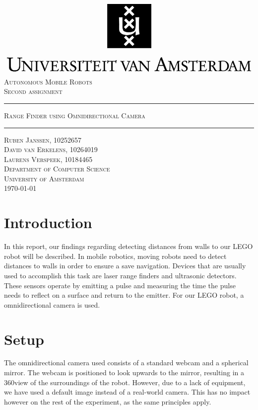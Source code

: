 \documentclass[12pt]{article}
\begin{document}
\begin{titlepage}
\begin{center}
    \includegraphics[width=\textwidth]{./logo.png}
    \\ [2.5cm]
    \textsc{\Large Autonomous Mobile Robots}
    \\ [0.5cm]
    \textsc{\large Second assignment}
    \\ [1cm]
    \hrule
    \vspace{0.3cm}
    \textsc{Range Finder using Omnidirectional Camera}
    \\ [0.3cm]
    \hrule
    \vfill
    \textsc{Ruben Janssen, 10252657 \\ David van Erkelens, 10264019 \\ Laurens Verspeek, 10184465 \\[0.7cm] Department of Computer Science \\ University of Amsterdam \\[0.3cm] \today}
\end{center}
\end{titlepage}
\tableofcontents
\clearpage
\section{Introduction}
In this report, our findings regarding detecting distances from walls to our LEGO robot will be described. In mobile robotics, moving robots need to detect distances to walls in order to ensure a save navigation. Devices that are usually used to accomplish this task are laser range finders and ultrasonic detectors. These sensors operate by emitting a pulse and measuring the time the pulse needs to reflect on a surface and return to the emitter. For our LEGO robot, a omnidirectional camera is used.

\section{Setup}
The omnidirectional camera used consists of a standard webcam and a spherical mirror. The webcam is positioned to look upwards to the mirror, resulting in a 360\textdegree view of the surroundings of the robot. However, due to a lack of equipment, we have used a default image instead of a real-world camera. This has no impact however on the rest of the experiment, as the same principles apply.
\end{document}
